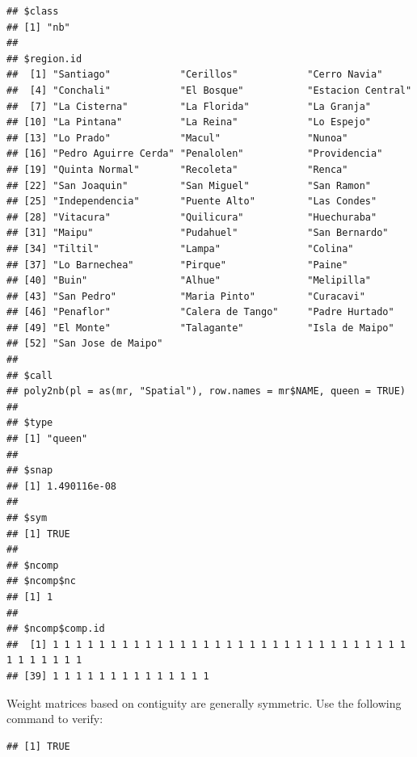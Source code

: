 \begin{knitrout}
\color{fgcolor}\begin{kframe}
\begin{alltt}
\end{alltt}
\begin{verbatim}
## $class
## [1] "nb"
## 
## $region.id
##  [1] "Santiago"            "Cerillos"            "Cerro Navia"        
##  [4] "Conchali"            "El Bosque"           "Estacion Central"   
##  [7] "La Cisterna"         "La Florida"          "La Granja"          
## [10] "La Pintana"          "La Reina"            "Lo Espejo"          
## [13] "Lo Prado"            "Macul"               "Nunoa"              
## [16] "Pedro Aguirre Cerda" "Penalolen"           "Providencia"        
## [19] "Quinta Normal"       "Recoleta"            "Renca"              
## [22] "San Joaquin"         "San Miguel"          "San Ramon"          
## [25] "Independencia"       "Puente Alto"         "Las Condes"         
## [28] "Vitacura"            "Quilicura"           "Huechuraba"         
## [31] "Maipu"               "Pudahuel"            "San Bernardo"       
## [34] "Tiltil"              "Lampa"               "Colina"             
## [37] "Lo Barnechea"        "Pirque"              "Paine"              
## [40] "Buin"                "Alhue"               "Melipilla"          
## [43] "San Pedro"           "Maria Pinto"         "Curacavi"           
## [46] "Penaflor"            "Calera de Tango"     "Padre Hurtado"      
## [49] "El Monte"            "Talagante"           "Isla de Maipo"      
## [52] "San Jose de Maipo"  
## 
## $call
## poly2nb(pl = as(mr, "Spatial"), row.names = mr$NAME, queen = TRUE)
## 
## $type
## [1] "queen"
## 
## $snap
## [1] 1.490116e-08
## 
## $sym
## [1] TRUE
## 
## $ncomp
## $ncomp$nc
## [1] 1
## 
## $ncomp$comp.id
##  [1] 1 1 1 1 1 1 1 1 1 1 1 1 1 1 1 1 1 1 1 1 1 1 1 1 1 1 1 1 1 1 1 1 1 1 1 1 1 1
## [39] 1 1 1 1 1 1 1 1 1 1 1 1 1 1
\end{verbatim}
\end{kframe}
\end{knitrout}

Weight matrices based on contiguity are generally symmetric. Use the following command to verify:
\begin{knitrout}
\color{fgcolor}\begin{kframe}
\begin{alltt}
\end{alltt}
\begin{verbatim}
## [1] TRUE
\end{verbatim}
\end{kframe}
\end{knitrout}

